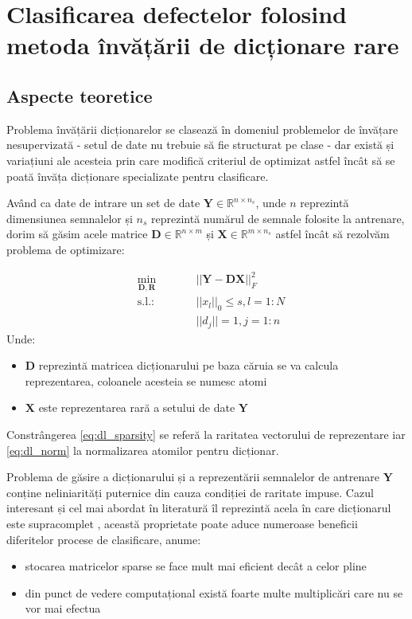 \chapter{Clasificarea defectelor folosind metoda învățării de dicționare rare}
\label{chap:dictionary_learning}
\section{Aspecte teoretice}
Problema învățării dicționarelor se clasează în domeniul problemelor de învățare nesupervizată - setul de date nu trebuie să fie structurat pe clase - dar există și variațiuni ale acesteia prin care modifică criteriul de optimizat astfel încât să se poată învăța dicționare specializate pentru clasificare.

Având ca date de intrare un set de date $\mathbf{Y} \in \mathbb{R}^{n \times n_s}$, unde $n$ reprezintă dimensiunea semnalelor și $n_s$ reprezintă numărul de semnale folosite la antrenare, dorim să găsim acele matrice $\mathbf{D} \in \mathbb{R}^{n \times m}$ și $\mathbf{X} \in \mathbb{R}^{m \times n_s}$ astfel încât să rezolvăm problema de optimizare\cite[Capitol 2]{DL_book}:

\begin{subequations}
\begin{alignat}{2}
&\!\min_{\mathbf{D}, \mathbf{R}}        &\qquad& ||\mathbf{Y} - \mathbf{D} \mathbf{X} ||^{2}_{F} \label{eq:dl_opt}\\
&\text{s.l.:} &      & ||x_l||_0  \leq s, l = 1:N \label{eq:dl_sparsity}\\
& & & ||d_j|| = 1, j = 1:n \label{eq:dl_norm}
\end{alignat}
\label{eq:dl_opt_problem}
\end{subequations}
Unde:
\begin{itemize}
    \item $\mathbf{D}$ reprezintă matricea dicționarului pe baza căruia se va calcula reprezentarea, coloanele acesteia se numesc atomi
    \item $\mathbf{X}$ este reprezentarea rară a setului de date $\mathbf{Y}$
\end{itemize}

Constrângerea \eqref{eq:dl_sparsity} se referă la raritatea vectorului de reprezentare iar \eqref{eq:dl_norm} la normalizarea atomilor pentru dicționar.

Problema de găsire a dicționarului și a reprezentării semnalelor de antrenare $\mathbf{Y}$ conține neliniarități puternice din cauza condiției de raritate impuse. Cazul interesant și cel mai abordat în literatură îl reprezintă acela în care dicționarul este supracomplet \cite[Capitolul 1]{DL_book}, această proprietate poate aduce numeroase beneficii diferitelor procese de clasificare, anume:
\begin{itemize}
    \item stocarea matricelor sparse se face mult mai eficient decât a celor pline
    \item din punct de vedere computațional există foarte multe multiplicări care nu se vor mai efectua
\end{itemize}

